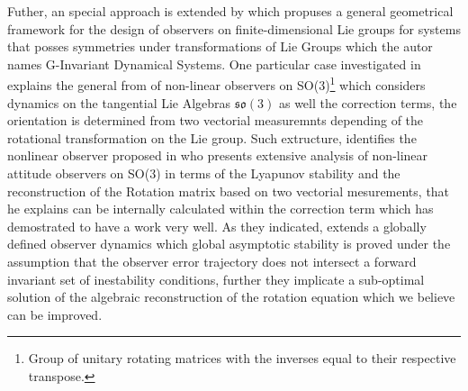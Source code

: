 \documentclass[conference]{IEEEtran}
\begin{document}
Futher, an special approach is extended by \cite{Bonabel2008} which propuses a general geometrical framework for the design of observers on finite-dimensional Lie groups for systems that posses symmetries under transformations of Lie Groups which the autor names G-Invariant Dynamical Systems. One particular case investigated in \cite{Bonabel2005} explains the general from of non-linear observers on SO(3)\footnote{Group of unitary rotating matrices with the inverses equal to their respective transpose.} which considers dynamics on the tangential Lie Algebras $\mathfrak{so}(3)$ as well the correction terms, the orientation is determined from two vectorial measuremnts depending of the rotational transformation on the Lie group. Such extructure, identifies the nonlinear observer proposed in \cite{Mahony2008} who presents extensive analysis of non-linear attitude observers on SO(3) in terms of the Lyapunov stability and the reconstruction of the Rotation matrix based on two vectorial mesurements, that he explains can be internally calculated within the correction term which has demostrated to have a work very well. As they indicated, \cite{Mahony2008} extends a globally defined observer dynamics which global asymptotic stability is proved under the assumption that the observer error trajectory does not intersect a forward invariant set of inestability conditions, further they implicate a sub-optimal solution of the algebraic reconstruction of the rotation equation which we believe can be improved. 
\end{document}
